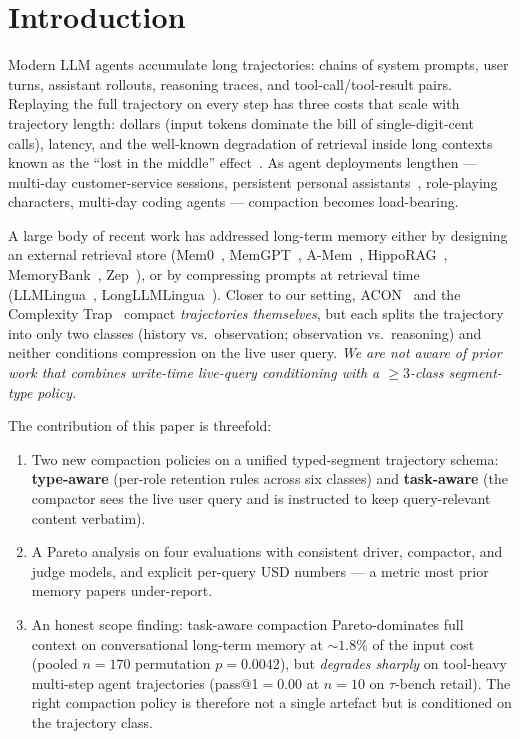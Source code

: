 \documentclass{article}
\begin{document}
\section{Introduction}\label{sec:intro}

Modern LLM agents accumulate long trajectories: chains of system prompts,
user turns, assistant rollouts, reasoning traces, and tool-call/tool-result
pairs. Replaying the full trajectory on every step has three costs that scale
with trajectory length: dollars (input tokens dominate the bill of
single-digit-cent calls), latency, and the well-known degradation of
retrieval inside long contexts known as the ``lost in the middle''
effect~\citep{lost_in_the_middle_2023}. As agent deployments lengthen ---
multi-day customer-service sessions, persistent personal
assistants~\citep{mem0_2025}, role-playing characters, multi-day coding
agents --- compaction becomes load-bearing.

A large body of recent work has addressed long-term memory either by
designing an external retrieval store (Mem0~\citep{mem0_2025},
MemGPT~\citep{memgpt_2023}, A-Mem~\citep{amem_2025},
HippoRAG~\citep{hipporag_2024}, MemoryBank~\citep{memorybank_2023},
Zep~\citep{zep_2025}), or by compressing prompts at retrieval time
(LLMLingua~\citep{llmlingua_2023}, LongLLMLingua~\citep{longllmlingua_2023}).
Closer to our setting, ACON~\citep{acon_2025} and
the Complexity Trap~\citep{complexity_trap_2025} compact \emph{trajectories
themselves}, but each splits the trajectory into only two classes
(history vs.\ observation; observation vs.\ reasoning) and neither
conditions compression on the live user query. \emph{We are not aware of
prior work that combines write-time live-query conditioning with a $\geq3$-class
segment-type policy.}

The contribution of this paper is threefold:
\begin{enumerate}
\item Two new compaction policies on a unified typed-segment trajectory
schema: \textbf{type-aware} (per-role retention rules across six classes)
and \textbf{task-aware} (the compactor sees the live user query and is
instructed to keep query-relevant content verbatim).
\item A Pareto analysis on four evaluations with consistent driver,
compactor, and judge models, and explicit per-query USD numbers --- a
metric most prior memory papers under-report.
\item An honest scope finding: task-aware compaction Pareto-dominates
full context on conversational long-term memory at $\sim\!1.8\%$ of the
input cost (pooled $n{=}170$ permutation $p{=}0.0042$), but
\emph{degrades sharply} on tool-heavy multi-step agent trajectories
(pass@1${=}0.00$ at $n{=}10$ on $\tau$-bench retail). The right
compaction policy is therefore not a single artefact but is conditioned
on the trajectory class.
\end{enumerate}
\end{document}
